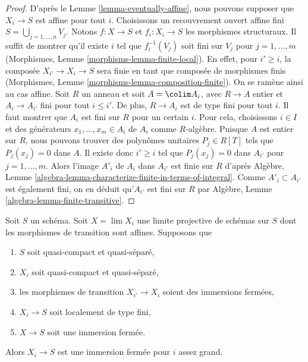 \begin{proof}
D'après le Lemme \ref{lemma-eventually-affine}, nous pouvons supposer que
$X_i \to S$ est affine pour tout $i$. Choisissons un recouvrement ouvert
affine fini $S = \bigcup_{j = 1, \ldots, n} V_j$. Notons $f : X \to S$ et
$f_i : X_i \to S$ les morphismes structuraux. Il suffit de montrer qu'il
existe $i$ tel que $f_i^{-1}(V_j)$ soit fini sur $V_j$ pour
$j = 1, \ldots, m$ (Morphismes,
Lemme \ref{morphisms-lemma-finite-local}). En effet, pour $i' \geq i$, la
composée $X_{i'} \to X_i \to S$ sera finie en tant que composée de morphismes
finis (Morphismes, Lemme \ref{morphisms-lemma-composition-finite}). On se
ramène ainsi au cas affine. Soit $R$ un anneau et soit $A = \colim A_i$, avec
$R \to A$ entier et $A_i \to A_{i'}$ fini pour tout $i \leq i'$. De plus,
$R \to A_i$ est de type fini pour tout $i$. Il faut montrer que $A_i$ est
fini sur $R$ pour un certain $i$. Pour cela, choisissons $i \in I$ et des
générateurs $x_1, \ldots, x_m \in A_i$ de $A_i$ comme $R$-algèbre. Puisque
$A$ est entier sur $R$, nous pouvons trouver des polynômes unitaires
$P_j \in R[T]$ tels que $P_j(x_j) = 0$ dans $A$. Il existe donc
$i' \geq i$ tel que $P_j(x_j) = 0$ dans $A_{i'}$ pour
$j = 1, \ldots, m$. Alors l'image $A'_i$ de $A_i$ dans $A_{i'}$ est finie
sur $R$ d'après Algèbre,
Lemme \ref{algebra-lemma-characterize-finite-in-terms-of-integral}. Comme
$A'_i \subset A_{i'}$ est également fini, on en déduit qu'$A_{i'}$ est fini
sur $R$ par Algèbre, Lemme \ref{algebra-lemma-finite-transitive}.
\end{proof}

\begin{lemma}
\label{lemma-eventually-closed-immersion}
Soit $S$ un schéma. Soit $X = \lim X_i$ une limite projective de schémas sur
$S$ dont les morphismes de transition sont affines. Supposons que
\begin{enumerate}
\item $S$ soit quasi-compact et quasi-séparé,
\item $X_i$ soit quasi-compact et quasi-séparé,
\item les morphismes de transition $X_{i'} \to X_i$ soient des immersions
fermées,
\item $X_i \to S$ soit localement de type fini,
\item $X \to S$ soit une immersion fermée.
\end{enumerate}
Alors $X_i \to S$ est une immersion fermée pour $i$ assez grand.
\end{lemma}

